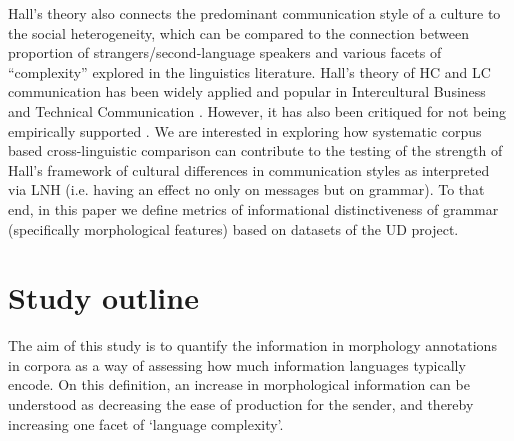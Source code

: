 \documentclass[USenglish]{article}
\begin{document}
Hall's theory also connects the predominant communication style of a culture to the social heterogeneity, which can be compared to the connection between proportion of strangers/second-language speakers and various facets of ``complexity'' explored in the linguistics literature.
Hall's theory of HC and LC communication has been widely applied and popular in Intercultural Business and Technical Communication \citep{meyer2016culture}.
However, it has also been critiqued for not being empirically supported \citep{cardon2008critique}.
We are interested in exploring how systematic corpus based cross-linguistic comparison can contribute to the testing of the strength of Hall's framework of cultural differences in communication styles as interpreted via LNH (i.e. having an effect no only on messages but on grammar).
To that end, in this paper we define metrics of informational distinctiveness of grammar (specifically morphological features) based on datasets of the UD project. 

\citet{hall1976beyond}



\FloatBarrier
\section{Study outline}
The aim of this study is to quantify the information in morphology annotations in corpora as a way of assessing how much information languages typically encode.
On this definition, an increase in morphological information can be understood as decreasing the ease of production for the sender, and thereby increasing one facet of `language complexity'.
\end{document}
